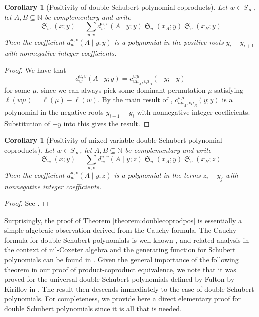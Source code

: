 \documentclass{amsart}
\newtheorem{corollary}[lemma]{Corollary}
\theoremstyle{definition}
\theoremstyle{remark}
\numberwithin{equation}{subsection}
\DeclareMathOperator{\sch}{\mathfrak{S}}
\newcommand{\cpcf}[5]{d^{#1,#2}_{#3}\left(#4\mid #5\right)}
\begin{document}
\begin{corollary}[Positivity of double Schubert polynomial coproducts]
Let $w\in S_\infty$, let $A,B\subseteq \mathbb{N}$ be complementary and write
$$\sch_w(x;y)=\sum_{u,v}\cpcf{u}{v}{w}{A}{y;y}\sch_u(x_A;y)\sch_v(x_B;y)$$
Then the coefficient $\cpcf{u}{v}{w}{A}{y;y}$ is a polynomial in the positive roots $y_i-y_{i+1}$ with nonnegative integer coefficients.
\end{corollary}
\begin{proof}
We have that
$$\cpcf{u}{v}{w}{A}{y;y}=c_{u\mu_A,v\mu_B}^{w\mu}(-y;-y)$$
for some $\mu$, since we can always pick some dominant permutation $\mu$ satisfying $\ell(w\mu)=\ell(\mu)-\ell(w)$. By the main result of \cite{graham2001positivity}, $c_{u\mu_A,v\mu_B}^{w\mu}(y;y)$ is a polynomial in the negative roots $y_{i+1}-y_i$ with nonnegative integer coefficients. Substitution of $-y$ into this gives the result.
\end{proof}

\begin{corollary}[Positivity of mixed variable double Schubert polynomial coproducts]
	Let $w\in S_\infty$, let $A,B\subseteq \mathbb{N}$ be complementary and write
	$$\sch_w(x;y)=\sum_{u,v}\cpcf{u}{v}{w}{A}{y;z}\sch_u(x_A;y)\sch_v(x_B;z)$$
	Then the coefficient $\cpcf{u}{v}{w}{A}{y;z}$ is a polynomial in the terms $z_i-y_j$ with nonnegative integer coefficients.
\end{corollary}
\begin{proof}
	See \cite[Theorem~1.1]{gao2025grahampositivitytripleschubert}.
\end{proof}


Surprisingly, the proof of Theorem \ref{theorem:doublecoprodpos} is essentially a simple algebraic observation derived from the Cauchy formula. The Cauchy formula for double Schubert polynomials is well-known \cite{notes}, and related analysis in the context of nil-Coxeter algebra and the generating function for Schubert polynomials can be found in \cite{fominstan}. Given the general importance of the following theorem in our proof of product-coproduct equivalence, we note that it was proved for the universal double Schubert polynomials defined by Fulton \cite{fulton1999universal} by Kirillov in \cite{kirillov2004cauchy}. The result then descends immediately to the case of double Schubert polynomials. For completeness, we provide here a direct elementary proof for double Schubert polynomials since it is all that is needed.
\end{document}
